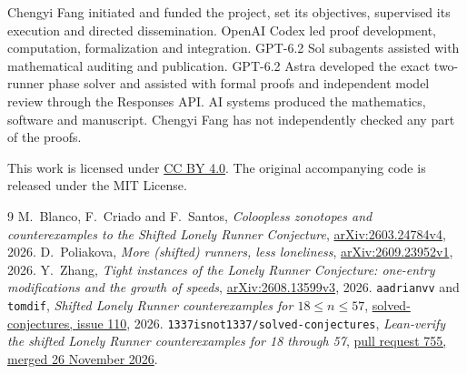 \documentclass[11pt]{article}
\begin{document}
Chengyi Fang initiated and funded the project, set its objectives,
supervised its execution and directed dissemination. OpenAI Codex led
proof development, computation, formalization and integration. GPT-6.2 Sol
subagents assisted with mathematical auditing and publication. GPT-6.2 Astra
developed the exact two-runner phase solver and assisted with formal proofs
and independent model review through the Responses API. AI systems produced
the mathematics, software and manuscript. Chengyi Fang has not independently
checked any part of the proofs.

\medskip\noindent
This work is licensed under
\href{https://creativecommons.org/licenses/by/4.0/}{CC BY 4.0}.
The original accompanying code is released under the MIT License.

\begingroup
\small
\begin{thebibliography}{9}
\setlength{\itemsep}{0pt}
M.~Blanco, F.~Criado and F.~Santos,
\emph{Coloopless zonotopes and counterexamples to the Shifted Lonely
Runner Conjecture}, \href{https://arxiv.org/abs/2603.24784v4}
{arXiv:2603.24784v4}, 2026.
D.~Poliakova, \emph{More (shifted) runners, less loneliness},
\href{https://arxiv.org/abs/2609.23952v1}{arXiv:2609.23952v1}, 2026.
Y.~Zhang, \emph{Tight instances of the Lonely Runner Conjecture:
one-entry modifications and the growth of speeds},
\href{https://arxiv.org/abs/2608.13599v3}{arXiv:2608.13599v3}, 2026.
\texttt{aadrianvv} and \texttt{tomdif},
\emph{Shifted Lonely Runner counterexamples for \(18\le n\le57\)},
\href{https://github.com/1337isnot1337/solved-conjectures/issues/110}
{solved-conjectures, issue 110}, 2026.
\texttt{1337isnot1337/solved-conjectures},
\emph{Lean-verify the shifted Lonely Runner counterexamples for 18 through 57},
\href{https://github.com/1337isnot1337/solved-conjectures/commit/9aefed33ac284780cf29b76d7914bc32877757af}
{pull request 755, merged 26 November 2026}.
\end{thebibliography}
\endgroup
\end{document}
